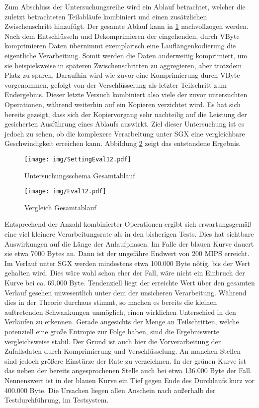 Zum Abschluss der Untersuchungsreihe wird ein Ablauf betrachtet, welcher die zuletzt betrachteten Teilabläufe kombiniert und einen zusätzlichen Zwischenschritt hinzufügt. Der gesamte Ablauf kann in \ref{fig:settingeval12} nachvollzogen werden. Nach dem Entschlüsseln und Dekomprimieren der eingehenden, durch VByte komprimieren Daten übernimmt exemplarisch eine Lauflängenkodierung die eigentliche Verarbeitung. Somit werden die Daten anderweitig komprimiert, um sie beispielsweise in späteren Zwischenschritten zu aggregieren, aber trotzdem Platz zu sparen. Daraufhin wird wie zuvor eine Komprimierung durch VByte vorgenommen, gefolgt von der Verschlüsselung als letzter Teilschritt zum Endergebnis. Dieser letzte Versuch kombiniert also viele der zuvor untersuchten Operationen, während weiterhin auf ein Kopieren verzichtet wird. Es hat sich bereits gezeigt, dass sich der Kopiervorgang sehr nachteilig auf die Leistung der gesicherten Ausführung eines Ablaufs auswirkt. Ziel dieser Untersuchung ist es jedoch zu sehen, ob die komplexere Verarbeitung unter \ac{SGX} eine vergleichbare Geschwindigkeit erreichen kann. Abbildung \ref{fig:eval12} zeigt das entstandene Ergebnis.

\begin{figure}[h]
	\texttt{[image: img/SettingEval12.pdf]}
	\centering
	\caption{Untersuchungsschema Gesamtablauf}
	\label{fig:settingeval12}
\end{figure}

\begin{figure}[h]
	\texttt{[image: img/Eval12.pdf]}
	\centering
	\caption{Vergleich Gesamtablauf}
	\label{fig:eval12}
\end{figure}

Entsprechend der Anzahl kombinierter Operationen ergibt sich erwartungsgemäß eine viel kleinere Verarbeitungsrate als in den bisherigen Tests. Dies hat sichtbare Auswirkungen auf die Länge der Anlaufphasen. Im Falle der blauen Kurve dauert sie etwa 7000 Bytes an. Dann ist der ungefähre Endwert von 200 \ac{MIPS} erreicht. Im Verlauf unter \ac{SGX} werden mindestens etwa 100.000 Byte nötig, bis der Wert gehalten wird. Dies wäre wohl schon eher der Fall, wäre nicht ein Einbruch der Kurve bei ca. 69.000 Byte. Tendenziell liegt der erreichte Wert über den gesamten Verlauf gesehen unwesentlich unter dem der unsicheren Verarbeitung. Während dies in der Theorie durchaus stimmt, so machen es bereits die kleinen auftretenden Schwankungen unmöglich, einen wirklichen Unterschied in den Verläufen zu erkennen. Gerade angesichts der Menge an Teilschritten, welche potenziell eine große Entropie zur Folge haben, sind die Ergebniswerte vergleichsweise stabil. Der Grund ist auch hier die Vorverarbeitung der Zufallsdaten durch Komprimierung und Verschlüsselung. An manchen Stellen sind jedoch größere Einstürze der Rate zu verzeichnen. In der grünen Kurve ist das neben der bereits angesprochenen Stelle auch bei etwa 136.000 Byte der Fall. Nennenswert ist in der blauen Kurve ein Tief gegen Ende des Durchlaufs kurz vor 400.000 Byte. Die Ursachen liegen allen Anschein nach außerhalb der Testdurchführung, im Testsystem.

